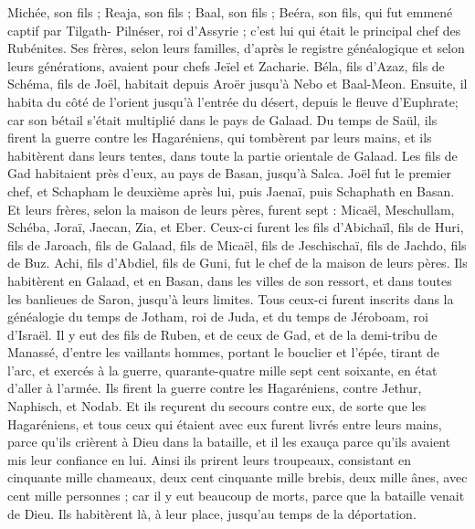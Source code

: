 \begin{multicols}{2}
Michée, son fils ; Reaja, son fils ; Baal,  son fils ;
Beéra, son fils, qui fut emmené captif par Tilgath- Pilnéser, roi d’Assyrie ; c'est lui qui était le principal chef des Rubénites.
Ses frères, selon leurs familles, d’après le registre généalogique et selon leurs générations, avaient pour chefs Jeïel et Zacharie.
Béla, fils d’Azaz, fils de Schéma, fils de Joël, habitait depuis Aroër jusqu'à Nebo et Baal-Meon.
Ensuite, il habita du côté de l’orient jusqu'à l'entrée du désert, depuis le fleuve d'Euphrate; car son bétail s'était multiplié dans le pays de Galaad.
Du temps de Saül, ils firent la guerre contre les Hagaréniens, qui tombèrent par leurs mains, et ils habitèrent dans leurs tentes, dans toute la partie orientale de Galaad.
Les fils de Gad habitaient près d'eux, au pays de Basan, jusqu'à Salca.
Joël fut le premier chef, et Schapham le deuxième après lui, puis Jaenaï, puis Schaphath en Basan.
Et leurs frères, selon la maison de leurs pères, furent sept : Micaël, Meschullam, Schéba, Joraï, Jaecan, Zia, et Eber.
Ceux-ci furent les fils d'Abichaïl, fils de Huri, fils de Jaroach, fils de Galaad, fils de Micaël, fils de Jeschischaï, fils de Jachdo, fils de Buz.
Achi, fils d'Abdiel, fils de Guni, fut le chef de la maison de leurs pères.
Ils habitèrent en Galaad, et en Basan, dans les villes de son ressort, et dans toutes les banlieues de Saron, jusqu’à leurs limites.
Tous ceux-ci furent inscrits dans la généalogie du temps de Jotham, roi de Juda, et du temps de Jéroboam, roi d'Israël.
Il y eut des fils de Ruben, et de ceux de Gad, et de la demi-tribu de Manassé, d'entre les vaillants hommes, portant le bouclier et l'épée, tirant de l'arc, et exercés à la guerre, quarante-quatre mille sept cent soixante, en état d’aller à l’armée.
Ils firent la guerre contre les Hagaréniens, contre Jethur, Naphisch, et Nodab.
Et ils reçurent du secours contre eux, de sorte que les Hagaréniens, et tous ceux qui étaient avec eux furent livrés entre leurs mains, parce qu'ils crièrent à Dieu dans la bataille, et il les exauça parce qu'ils avaient mis leur confiance en lui.
Ainsi ils prirent leurs troupeaux, consistant en cinquante mille chameaux, deux cent cinquante mille brebis, deux mille ânes, avec cent mille personnes ;
car il y eut beaucoup de morts, parce que la bataille venait de Dieu.  Ils habitèrent là, à leur place, jusqu'au temps de la déportation.

\end{multicols}
